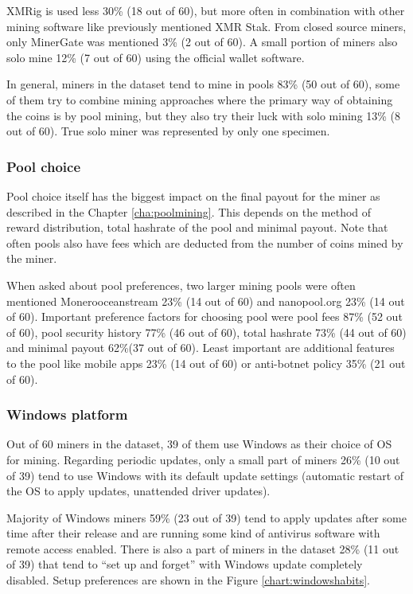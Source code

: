 \documentclass[
  printed, %
  table,   %
  lof,     %
  lot,     %
           oneside, color
]{fithesis3}
\begin{document}
\vspace{-2em}
XMRig is used less 30\% (18 out of 60), but more often in combination with other mining software like previously mentioned XMR Stak. From closed source miners, only MinerGate was mentioned 3\% (2 out of 60). A small portion of miners also solo mine 12\% (7 out of 60) using the official wallet software. 
 
In general, miners in the dataset tend to mine in pools 83\% (50 out of 60), some of them try to combine mining approaches where the primary way of obtaining the coins is by pool mining, but they also try their luck with solo mining 13\% (8 out of 60). True solo miner was represented by only one specimen. 

\subsubsection{Pool choice}
Pool choice itself has the biggest impact on the final payout for the miner as described in the Chapter \ref{cha:poolmining}. This depends on the method of reward distribution, total hashrate of the pool and minimal payout. Note that often pools also have fees which are deducted from the number of coins mined by the miner.

When asked about pool preferences, two larger mining pools were often mentioned Monerooceanstream 23\% (14 out of 60) and nanopool.org 23\% (14 out of 60). Important preference factors for choosing pool were pool fees 87\% (52 out of 60), pool security history 77\% (46 out of 60), total hashrate 73\% (44 out of 60) and minimal payout 62\%(37 out of 60). Least important are additional features to the pool like mobile apps 23\% (14 out of 60) or anti-botnet policy 35\% (21 out of 60).
\subsubsection{Windows platform}
Out of 60 miners in the dataset, 39 of them use Windows as their choice of OS for mining. Regarding periodic updates, only a small part of miners 26\% (10 out of 39) tend to use Windows with its default update settings (automatic restart of the OS to apply updates, unattended driver updates). 

Majority of Windows miners 59\% (23 out of 39) tend to apply updates after some time after their release and are running some kind of antivirus software with remote access enabled. There is also a part of miners in the dataset 28\% (11 out of 39) that tend to \enquote{set up and forget} with Windows update completely disabled. Setup preferences are shown in the Figure \ref{chart:windowshabits}.
\end{document}
